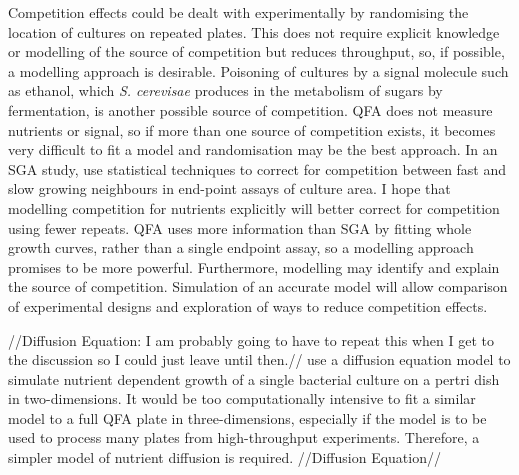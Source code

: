 Competition effects could be dealt with experimentally by randomising
the location of cultures on repeated plates. This does not require
explicit knowledge or modelling of the source of competition but
reduces throughput, so, if possible, a modelling approach is
desirable. Poisoning of cultures by a signal molecule such as ethanol,
which \textit{S. cerevisae} produces in the metabolism of sugars by
fermentation, is another possible source of competition. QFA does not
measure nutrients or signal, so if more than one source of competition
exists, it becomes very difficult to fit a model and randomisation may
be the best approach. In an SGA study, \citet{Baryshnikova2010} use
statistical techniques to correct for competition between fast and
slow growing neighbours in end-point assays of culture area. I hope
that modelling competition for nutrients explicitly will better
correct for competition using fewer repeats. QFA uses more information
than SGA by fitting whole growth curves, rather than a single endpoint
assay, so a modelling approach promises to be more
powerful.
Furthermore, modelling may identify and
explain the source of competition. Simulation of an accurate model
will allow comparison of experimental designs and exploration of ways to
reduce competition effects.

//Diffusion Equation: I am probably going to have to repeat this
when I get to the discussion so I could just leave until then.//
\citet{Reo2014} use a diffusion equation model to simulate nutrient
dependent growth of a single bacterial culture on a pertri dish in
two-dimensions. It would be too computationally intensive to fit a
similar model to a full QFA plate in three-dimensions, especially if
the model is to be used to process many plates from high-throughput
experiments. Therefore, a simpler model of nutrient diffusion is
required. //Diffusion Equation//


